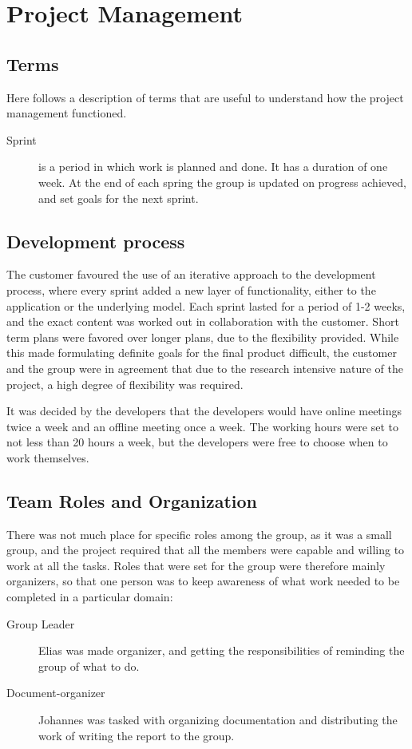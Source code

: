 \chapter{Project Management}
\section{Terms}
Here follows a description of terms that are useful to understand how the project management functioned. 

\begin{description}
\item[Sprint] is a period in which work is planned and done. It has a duration of one week. At the end of each spring the group is updated on progress achieved, and set goals for the next sprint. 
\end{description}
\section{Development process}

The customer favoured the use of an iterative approach to the development process, where every sprint added a new layer of functionality, either to the application or the underlying model. Each sprint lasted for a period of 1-2 weeks, and the exact content was worked out in collaboration with the customer. Short term plans were favored over longer plans, due to the flexibility provided. While this made formulating definite goals for the final product difficult, the customer and the group were in agreement that due to the research intensive nature of the project, a high degree of flexibility was required. 

It was decided by the developers that the developers would have online meetings twice a week and an offline meeting once a week. 
The working hours were set to not less than 20 hours a week, but the developers were free to choose when to work themselves.

\section{Team Roles and Organization}
There was not much place for specific roles among the group, as it was a small group, and the project required that all the members were capable and willing to work at all the tasks. Roles that were set for the group were therefore mainly organizers, so that one person was to keep awareness of what work needed to be completed in a particular domain:
\begin{description}

\item[Group Leader] Elias was made organizer, and getting the responsibilities of reminding the group of what to do.
\item[Document-organizer] Johannes was tasked with organizing documentation and distributing the work of writing the report to the group. 
\end{description}

